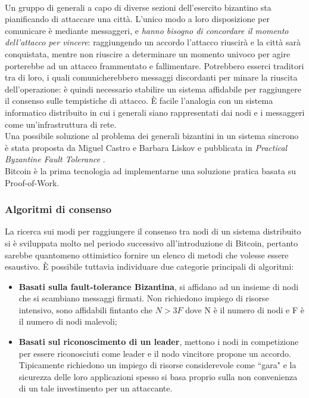 			\paragraph{}
			Un gruppo di generali a capo di diverse sezioni dell'esercito bizantino sta pianificando di attaccare una città. L'unico modo a loro disposizione per comunicare è mediante messaggeri, e \emph{hanno bisogno di concordare il momento dell'attacco per vincere}: raggiungendo un accordo l'attacco riuscirà e la città sarà conquistata, mentre non riuscire a determinare un momento univoco per agire porterebbe ad un attacco frammentato e fallimentare. Potrebbero esserci traditori tra di loro, i quali comunicherebbero messaggi discordanti per minare la riuscita dell'operazione: è quindi necessario stabilire un sistema affidabile per raggiungere il consenso sulle tempistiche di attacco. È facile l'analogia con un sistema informatico distribuito in cui i generali siano rappresentati dai nodi e i messaggeri come un'infrastruttura di rete. \\
			Una possibile soluzione al problema dei generali bizantini in un sistema sincrono è stata proposta da Miguel Castro e Barbara Liskov e pubblicata in \emph{Practical Byzantine Fault Tolerance} \cite{PBFT}. \\
			Bitcoin è la prima tecnologia ad implementarne una soluzione pratica basata su Proof-of-Work.

		\subsubsection{Algoritmi di consenso}
			La ricerca sui modi per raggiungere il consenso tra nodi di un sistema distribuito si è sviluppata molto nel periodo successivo all'introduzione di Bitcoin, pertanto sarebbe quantomeno ottimistico fornire un elenco di metodi che volesse essere esaustivo. È possibile tuttavia individuare due categorie principali di algoritmi:
			\begin{itemize}
				\item \textbf{Basati sulla fault-tolerance Bizantina}, si affidano ad un insieme di nodi che si scambiano messaggi firmati. Non richiedono impiego di risorse intensivo, sono affidabili fintanto che $N > 3F$ dove N è il numero di nodi e F è il numero di nodi malevoli;
				\item \textbf{Basati sul riconoscimento di un leader}, mettono i nodi in competizione per essere riconosciuti come leader e il nodo vincitore propone un accordo. Tipicamente richiedono un impiego di risorse considerevole come ``gara" e la sicurezza delle loro applicazioni spesso si basa proprio sulla non convenienza di un tale investimento per un attaccante.
			\end{itemize}


